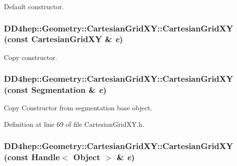 Default constructor. \hypertarget{class_d_d4hep_1_1_geometry_1_1_cartesian_grid_x_y_ac3b77b74ddadb039490b10f21492d55d}{
\subsubsection[{CartesianGridXY}]{\setlength{\rightskip}{0pt plus 5cm}DD4hep::Geometry::CartesianGridXY::CartesianGridXY (const {\bf CartesianGridXY} \& {\em e})}}
\label{class_d_d4hep_1_1_geometry_1_1_cartesian_grid_x_y_ac3b77b74ddadb039490b10f21492d55d}


Copy constructor. \hypertarget{class_d_d4hep_1_1_geometry_1_1_cartesian_grid_x_y_ae96dc4f394b3eaded63e07e88fa97e62}{
\subsubsection[{CartesianGridXY}]{\setlength{\rightskip}{0pt plus 5cm}DD4hep::Geometry::CartesianGridXY::CartesianGridXY (const {\bf Segmentation} \& {\em e})}}
\label{class_d_d4hep_1_1_geometry_1_1_cartesian_grid_x_y_ae96dc4f394b3eaded63e07e88fa97e62}


Copy Constructor from segmentation base object. 

Definition at line 69 of file CartesianGridXY.h.\hypertarget{class_d_d4hep_1_1_geometry_1_1_cartesian_grid_x_y_a5ac01bc898ef0925a5f80e2df58da136}{
\subsubsection[{CartesianGridXY}]{\setlength{\rightskip}{0pt plus 5cm}DD4hep::Geometry::CartesianGridXY::CartesianGridXY (const {\bf Handle}$<$ {\bf Object} $>$ \& {\em e})}}
\label{class_d_d4hep_1_1_geometry_1_1_cartesian_grid_x_y_a5ac01bc898ef0925a5f80e2df58da136}


